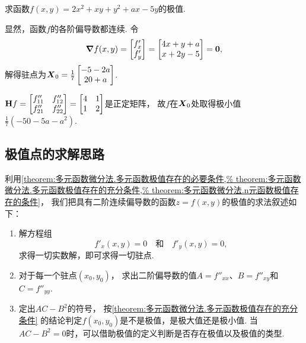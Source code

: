 \begin{example}
求函数\(f(x,y) = 2x^2 + xy + y^2 + ax - 5y\)的极值.
\begin{solution}
显然，函数\(f\)的各阶偏导数都连续.
令\[
	\grad f(x,y) = \begin{bmatrix} f'_x \\ f'_y \end{bmatrix}
	= \begin{bmatrix} 4x+y+a \\ x+2y-5 \end{bmatrix} = \boldsymbol{0},
\]
解得驻点为\(\boldsymbol{X}_{0} = \frac{1}{7} \begin{bmatrix} -5-2a \\ 20+a \end{bmatrix}\).

\(\boldsymbol{\operatorname{H}} f = \begin{bmatrix}
	f''_{11} & f''_{12} \\
	f''_{21} & f''_{22}
\end{bmatrix}
= \begin{bmatrix}
4 & 1 \\
1 & 2
\end{bmatrix}\)是正定矩阵，
故\(f\)在\(\boldsymbol{X}_{0}\)处取得极小值\(\frac{1}{7} (-50-5a-a^2)\).
\end{solution}
\end{example}

\subsection{极值点的求解思路}
利用\cref{theorem:多元函数微分法.多元函数极值存在的必要条件,%
theorem:多元函数微分法.多元函数极值存在的充分条件,%
theorem:多元函数微分法.n元函数极值存在的条件}，
我们把具有二阶连续偏导数的函数\(z = f(x,y)\)的极值的求法叙述如下：
\begin{enumerate}
	\item 解方程组\[
		f'_x(x,y) = 0
		\quad\text{和}\quad
		f'_y(x,y) = 0,
	\]求得一切实数解，即可求得一切驻点.

	\item 对于每一个驻点\((x_0,y_0)\)，
	求出二阶偏导数的值\(A=f''_{xx}\)、\(B=f''_{xy}\)和\(C=f''_{yy}\).

	\item 定出\(AC-B^2\)的符号，
	按\cref{theorem:多元函数微分法.多元函数极值存在的充分条件}
	的结论判定\(f(x_0,y_0)\)是不是极值，是极大值还是极小值.
	当\(AC-B^2=0\)时，可以借助极值的定义判断是否存在极值以及极值的类型.
\end{enumerate}


